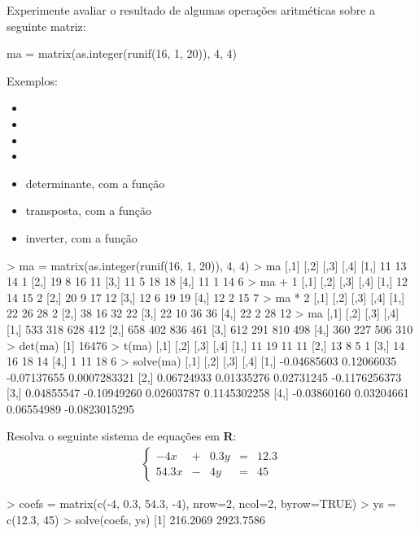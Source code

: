 \documentclass{exam}
\begin{document}
\begin{questions}
\question Experimente avaliar o resultado de algumas operações aritméticas sobre a seguinte matriz:
\begin{rcode}
	ma = matrix(as.integer(runif(16, 1, 20)), 4, 4)
\end{rcode}
Exemplos:
\begin{itemize}
\item {}
\item {}
\item {}
\item {}
\item determinante, com a função 
\item transposta, com a função 
\item inverter, com a função 
\end{itemize}

\begin{solution}
	\begin{rcode}
		> ma = matrix(as.integer(runif(16, 1, 20)), 4, 4)
		> ma
		      [,1] [,2] [,3] [,4]
		[1,]   11   13   14    1
		[2,]   19    8   16   11
		[3,]   11    5   18   18
		[4,]   11    1   14    6
		> ma + 1
		     [,1] [,2] [,3] [,4]
		[1,]   12   14   15    2
		[2,]   20    9   17   12
		[3,]   12    6   19   19
		[4,]   12    2   15    7
		> ma * 2
		     [,1] [,2] [,3] [,4]
		[1,]   22   26   28    2
		[2,]   38   16   32   22
		[3,]   22   10   36   36
		[4,]   22    2   28   12
		> ma %
		     [,1] [,2] [,3] [,4]
		[1,]  533  318  628  412
		[2,]  658  402  836  461
		[3,]  612  291  810  498
		[4,]  360  227  506  310
		> det(ma)
		[1] 16476
		> t(ma)
		     [,1] [,2] [,3] [,4]
		[1,]   11   19   11   11
		[2,]   13    8    5    1
		[3,]   14   16   18   14
		[4,]    1   11   18    6
		> solve(ma)
		            [,1]        [,2]        [,3]          [,4]
		[1,] -0.04685603  0.12066035 -0.07137655  0.0007283321
		[2,]  0.06724933  0.01335276  0.02731245 -0.1176256373
		[3,]  0.04855547 -0.10949260  0.02603787  0.1145302258
		[4,] -0.03860160  0.03204661  0.06554989 -0.0823015295
		
	\end{rcode}
\end{solution}

\question Resolva o seguinte sistema de equações em \textbf{R}:
\begin{align*}
\left\{\begin{matrix}
-4x & + & 0.3y & = & 12.3 \\
54.3x & - & 4y & = & 45
\end{matrix}\right.
\end{align*}

\begin{solution}
	\begin{rcode}
		> coefs = matrix(c(-4, 0.3, 54.3, -4), nrow=2, ncol=2, byrow=TRUE)
		> ys = c(12.3, 45)
		> solve(coefs, ys)
		[1]  216.2069 2923.7586
	\end{rcode}
\end{solution}

\end{questions}
\end{document}
